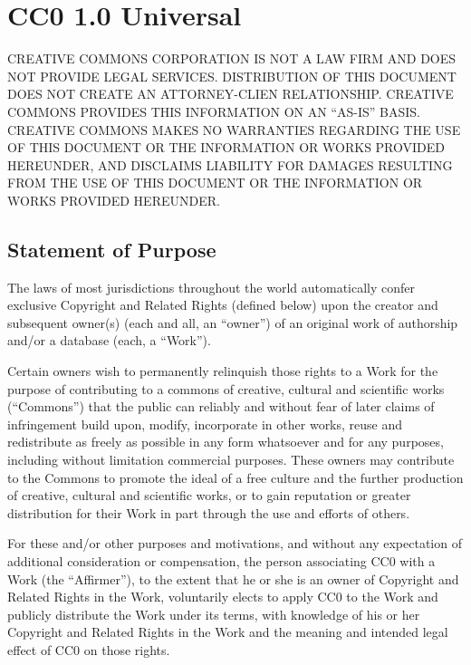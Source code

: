 \chapter{CC0 1.0 Universal}

\MakeUppercase{%
    Creative Commons Corporation is not a law firm and does not
    provide legal services. Distribution of this document does not
    create an attorney-clien relationship. Creative Commons
    provides this information on an ``as-is'' basis. Creative
    Commons makes no warranties regarding the use of this document
    or the information or works provided hereunder, and disclaims
    liability for damages resulting from the use of this document
    or the information or works provided hereunder.%
}

\section{Statement of Purpose}

The laws of most jurisdictions throughout the world automatically
confer exclusive Copyright and Related Rights (defined below) upon
the creator and subsequent owner(s) (each and all, an ``owner'')
of an original work of authorship and/or a database (each, a
``Work'').

Certain owners wish to permanently relinquish those rights to a
Work for the purpose of contributing to a commons of creative,
cultural and scientific works (``Commons'') that the public can
reliably and without fear of later claims of infringement build
upon, modify, incorporate in other works, reuse and redistribute
as freely as possible in any form whatsoever and for any purposes,
including without limitation commercial purposes. These owners may
contribute to the Commons to promote the ideal of a free culture
and the further production of creative, cultural and scientific
works, or to gain reputation or greater distribution for their
Work in part through the use and efforts of others.

For these and/or other purposes and motivations, and without any
expectation of additional consideration or compensation, the
person associating CC0 with a Work (the ``Affirmer''), to the
extent that he or she is an owner of Copyright and Related Rights
in the Work, voluntarily elects to apply CC0 to the Work and
publicly distribute the Work under its terms, with knowledge of
his or her Copyright and Related Rights in the Work and the
meaning and intended legal effect of CC0 on those rights.

